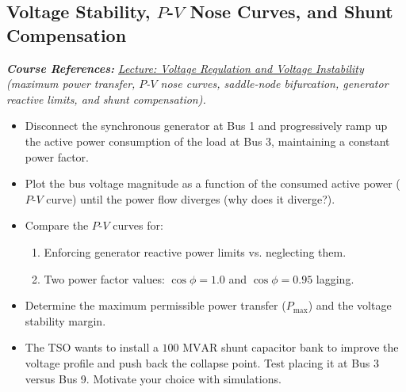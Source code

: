 \documentclass[11pt]{article}
\begin{document}
  \subsection{Voltage Stability, $P$-$V$ Nose Curves, and Shunt Compensation}
  \label{sec:voltage_stability}
  \noindent\textit{\textbf{Course References:} \href{https://github.com/bcornelusse/ELEC0447-analysis-power-systems/blob/master/Lectures/voltage_stability/voltage_stability.pdf}{Lecture: Voltage Regulation and Voltage Instability} (maximum power transfer, $P$-$V$ nose curves, saddle-node bifurcation, generator reactive limits, and shunt compensation).}
  \begin{itemize}
    \item Disconnect the synchronous generator at Bus 1 and progressively ramp up the active power consumption of the load at Bus 3, maintaining a constant power factor.
    \item Plot the bus voltage magnitude as a function of the consumed active power ($P$-$V$ curve) until the power flow diverges (why does it diverge?).
    \item Compare the $P$-$V$ curves for:
    \begin{enumerate}
      \item Enforcing generator reactive power limits vs. neglecting them.
      \item Two power factor values: $\cos \phi = 1.0$ and $\cos \phi = 0.95$ lagging.
    \end{enumerate}
    \item Determine the maximum permissible power transfer ($P_{\text{max}}$) and the voltage stability margin.
    \item The TSO wants to install a $100\text{ MVAR}$ shunt capacitor bank to improve the voltage profile and push back the collapse point. Test placing it at Bus 3 versus Bus 9. Motivate your choice with simulations.
  \end{itemize}
\end{document}
